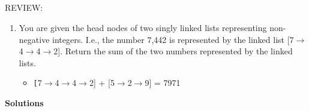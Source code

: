\documentclass{article}
\begin{document}
    \subsection*{}
    REVIEW:
    \begin{enumerate}
        \item You are given the head nodes of two singly linked lists representing non-negative integers. I.e., the number 7,442 is represented by the linked list [7$\rightarrow$4$\rightarrow$4$\rightarrow$2]. Return the sum of the two numbers represented by the linked lists.
        \begin{itemize}
            \item \texttt[7$\rightarrow$4$\rightarrow$4$\rightarrow$2] + [5$\rightarrow$2$\rightarrow$9] = 7971

        \end{itemize}
    \end{enumerate}
    \clearpage
    \begin{center}
        \textbf{Solutions}
    \end{center}
\end{document}

